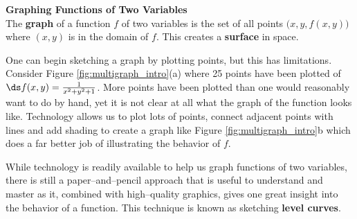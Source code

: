 \noindent\textbf{\large Graphing Functions of Two Variables}\\

The \textbf{graph} of a function $f$ of two variables is the set of all points $\big(x,y,f(x,y)\big)$ where $(x,y)$ is in the domain of $f$. This creates a \textbf{surface} in space.

One can begin sketching a graph by plotting points, but this has limitations. Consider Figure \ref{fig:multigraph_intro}(a) where 25 points have been plotted of $\ds f(x,y) = \frac1{x^2+y^2+1}$. More points have been plotted than one would reasonably want to do by hand, yet it is not clear at all what the graph of the function looks like. Technology allows us to plot lots of points, connect adjacent points with lines and add shading to create a graph like Figure \ref{fig:multigraph_intro}b which does a far better job of illustrating the behavior of $f$.

While technology is readily available to help us graph functions of two variables, there is still a paper--and--pencil approach that is useful to understand and master as it, combined with high--quality graphics, gives one great insight into the behavior of a function. This technique is known as sketching \textbf{level curves}.\\

